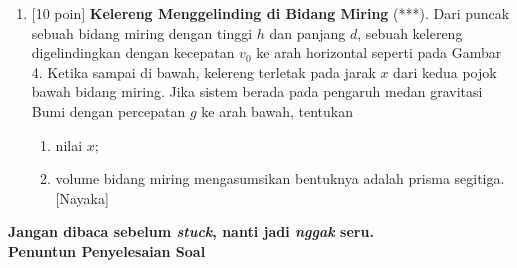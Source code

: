 \documentclass[12pt, a4paper]{article}\usepackage[utf8]{inputenc}
\theoremstyle{definition}
\theoremstyle{definition}
\begin{document}
\begin{enumerate}
		\item $[$10 poin$]$ \textbf{Kelereng Menggelinding di Bidang Miring} (***). Dari puncak sebuah bidang miring dengan tinggi $h$ dan panjang $d$, sebuah kelereng digelindingkan dengan kecepatan $v_0$ ke arah horizontal seperti pada Gambar 4. Ketika sampai di bawah, kelereng terletak pada jarak $x$ dari kedua pojok bawah bidang miring. Jika sistem berada pada pengaruh medan gravitasi Bumi dengan percepatan $g$ ke arah bawah, tentukan
		\begin{enumerate}[label=(\alph*)]
			\item nilai $x$;
			\item volume bidang miring mengasumsikan bentuknya adalah prisma segitiga. [Nayaka]
		\end{enumerate} 
	\end{enumerate}
	
			\pagebreak
	
	\textbf{\small Jangan dibaca sebelum \textit{stuck}, nanti jadi \textit{nggak} seru.
		\\[.5em]
		\LARGE Penuntun Penyelesaian Soal}
	\\ 
	
\end{document}
